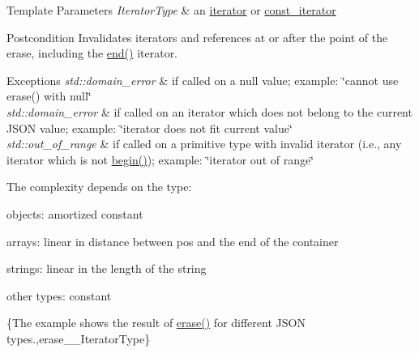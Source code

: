 \begin{DoxyTemplParams}{Template Parameters}
{\em Iterator\+Type} & an \hyperlink{classnlohmann_1_1basic__json_1_1iterator}{iterator} or \hyperlink{classnlohmann_1_1basic__json_1_1const__iterator}{const\+\_\+iterator}\\
\hline
\end{DoxyTemplParams}
\begin{DoxyPostcond}{Postcondition}
Invalidates iterators and references at or after the point of the erase, including the {\ttfamily \hyperlink{classnlohmann_1_1basic__json_a12ccf14d39ddae52f6c7e126105a230b}{end()}} iterator.
\end{DoxyPostcond}

\begin{DoxyExceptions}{Exceptions}
{\em std\+::domain\+\_\+error} & if called on a {\ttfamily null} value; example\+: {\ttfamily \char`\"{}cannot
use erase() with null\char`\"{}} \\
\hline
{\em std\+::domain\+\_\+error} & if called on an iterator which does not belong to the current J\+S\+ON value; example\+: {\ttfamily \char`\"{}iterator does not fit current value\char`\"{}} \\
\hline
{\em std\+::out\+\_\+of\+\_\+range} & if called on a primitive type with invalid iterator (i.\+e., any iterator which is not {\ttfamily \hyperlink{classnlohmann_1_1basic__json_ad4e381c54039607be08d7af41a1f6ad1}{begin()}}); example\+: {\ttfamily \char`\"{}iterator
out of range\char`\"{}}\\
\hline
\end{DoxyExceptions}
The complexity depends on the type\+:
\begin{DoxyItemize}
\item objects\+: amortized constant
\item arrays\+: linear in distance between pos and the end of the container
\item strings\+: linear in the length of the string
\item other types\+: constant
\end{DoxyItemize}

\{The example shows the result of {\ttfamily \hyperlink{classnlohmann_1_1basic__json_ab9f8c9a02d6bb794ee26801a232ca4f4}{erase()}} for different J\+S\+ON types.,erase\+\_\+\+\_\+\+Iterator\+Type\}

